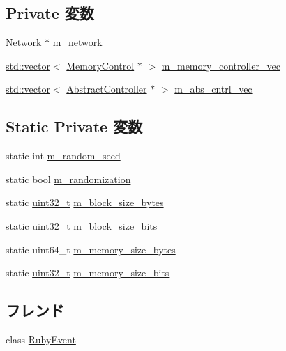 \subsection*{Private 変数}
\begin{DoxyCompactItemize}
\item 
\hyperlink{classNetwork}{Network} $\ast$ \hyperlink{classRubySystem_a9ee1ed03705a87b18e7244ead083c182}{m\_\-network}
\item 
\hyperlink{classstd_1_1vector}{std::vector}$<$ \hyperlink{classMemoryControl}{MemoryControl} $\ast$ $>$ \hyperlink{classRubySystem_a666fa896076bf9fd8b1e86b823fc36b5}{m\_\-memory\_\-controller\_\-vec}
\item 
\hyperlink{classstd_1_1vector}{std::vector}$<$ \hyperlink{classAbstractController}{AbstractController} $\ast$ $>$ \hyperlink{classRubySystem_adb7cc2941698a199e44de621cf24f868}{m\_\-abs\_\-cntrl\_\-vec}
\end{DoxyCompactItemize}
\subsection*{Static Private 変数}
\begin{DoxyCompactItemize}
\item 
static int \hyperlink{classRubySystem_af65ef68d40faf23fe1e78331e0447958}{m\_\-random\_\-seed}
\item 
static bool \hyperlink{classRubySystem_aa846ca9467116a26a879dc4b262cf36a}{m\_\-randomization}
\item 
static \hyperlink{Type_8hh_a435d1572bf3f880d55459d9805097f62}{uint32\_\-t} \hyperlink{classRubySystem_a6ffc54d275164accb6a789f59f228ee1}{m\_\-block\_\-size\_\-bytes}
\item 
static \hyperlink{Type_8hh_a435d1572bf3f880d55459d9805097f62}{uint32\_\-t} \hyperlink{classRubySystem_a138d3bdf8b6cd953f0bf8634db379365}{m\_\-block\_\-size\_\-bits}
\item 
static uint64\_\-t \hyperlink{classRubySystem_af9b18a9cc774821d72777f50821b4429}{m\_\-memory\_\-size\_\-bytes}
\item 
static \hyperlink{Type_8hh_a435d1572bf3f880d55459d9805097f62}{uint32\_\-t} \hyperlink{classRubySystem_afcfee986c39619dff25c7e96187708c0}{m\_\-memory\_\-size\_\-bits}
\end{DoxyCompactItemize}
\subsection*{フレンド}
\begin{DoxyCompactItemize}
\item 
class \hyperlink{classRubySystem_a384b2b27e44aae348fc2c459a78d4a90}{RubyEvent}
\end{DoxyCompactItemize}


